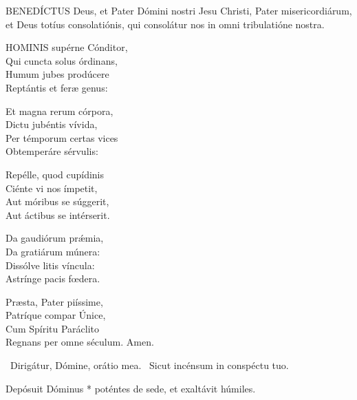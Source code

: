 



\lettrine[lines=2]{B}{ENEDÍCTUS} Deus, et Pater Dómini nostri Jesu Christi, Pater misericordiárum, et Deus totíus consolatiónis, qui consolátur nos in omni tribulatióne nostra.


\lettrine[lines=2]{H}{OMINIS} supérne Cónditor,\\
Qui cuncta solus órdinans,\\
Humum jubes prodúcere\\
Reptántis et feræ genus:

Et magna rerum córpora,\\
Dictu jubéntis vívida,\\
Per témporum certas vices\\
Obtemperáre sérvulis:

Repélle, quod cupídinis\\
Ciénte vi nos ímpetit,\\
Aut móribus se súggerit,\\
Aut áctibus se intérserit.

Da gaudiórum prǽmia,\\
Da gratiárum múnera:\\
Dissólve litis víncula:\\
Astrínge pacis fœdera.

Præsta, Pater piíssime,\\
Patríque compar Únice,\\
Cum Spíritu Paráclito\\
Regnans per omne séculum. Amen.

\V\ Dirigátur, Dómine, orátio mea. \R\ Sicut incénsum in conspéctu tuo.


 Depósuit Dóminus * poténtes de sede, et exaltávit húmiles.



\sectionornament

